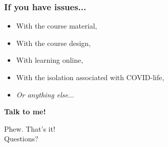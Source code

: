 \documentclass[11pt]{beamer}
\begin{document}
\begin{frame}
\frametitle{If you have issues...}
\begin{itemize}
  \pause \item With the course material,
  \pause \item With the course design,
  \pause \item With learning online,
  \pause \item With the isolation associated with COVID-life,
  \pause \item \emph{Or anything else}...
\end{itemize}
\pause \textbf{Talk to me!}
\end{frame}

\begin{frame}[c]
\centering
Phew. That's it!   \\
Questions?
\end{frame}
\end{document}

